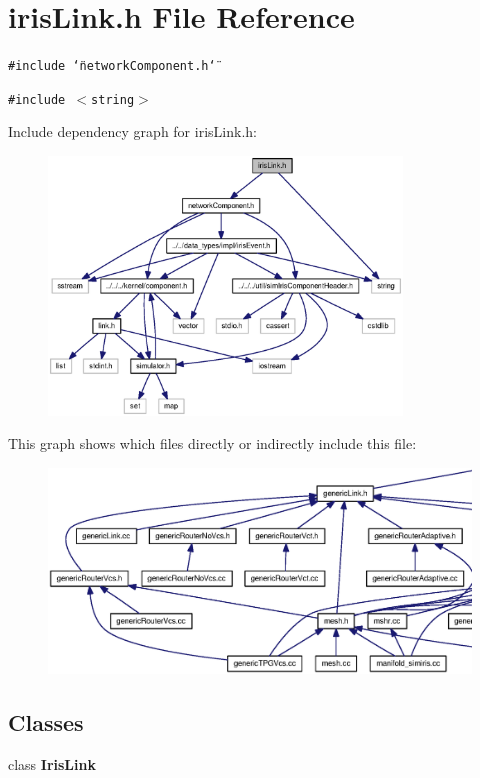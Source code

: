\section{irisLink.h File Reference}
\label{irisLink_8h}
{\tt \#include \char`\"{}networkComponent.h\char`\"{}}\par
{\tt \#include $<$string$>$}\par


Include dependency graph for irisLink.h:\nopagebreak
\begin{figure}[H]
\begin{center}
\leavevmode
\includegraphics[width=266pt]{irisLink_8h__incl}
\end{center}
\end{figure}


This graph shows which files directly or indirectly include this file:\nopagebreak
\begin{figure}[H]
\begin{center}
\leavevmode
\includegraphics[width=420pt]{irisLink_8h__dep__incl}
\end{center}
\end{figure}
\subsection*{Classes}
\begin{CompactItemize}
\item 
class {\bf IrisLink}
\end{CompactItemize}
